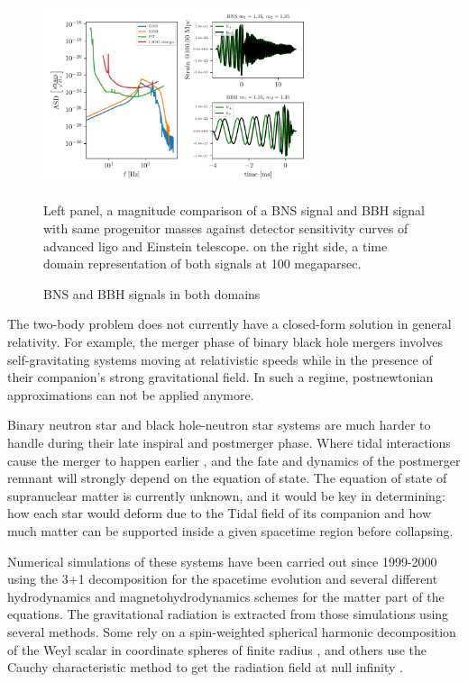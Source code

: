 \begin{figure}[hbt!]
\begin{center}

\includegraphics[width=0.7\textwidth, angle=0]{images/Data_analysis/sig_proc/BNS-BBH.pdf}
\caption{BNS and BBH signals in both domains}
\label{BBH and BNS}
\end{center}

Left panel, a magnitude comparison of a BNS signal\cite{Dietrich:2018phi} and BBH signal\cite{Estelles:2020osj} with same progenitor masses against detector sensitivity curves of advanced ligo and Einstein telescope. on the right side, a time domain representation of both signals at 100 megaparsec.

\end{figure}

\FloatBarrier


The two-body problem does not currently have a closed-form solution in general relativity. For example, the merger phase of binary black hole mergers involves self-gravitating systems moving at relativistic speeds while in the presence of their companion's strong gravitational field. In such a regime, postnewtonian approximations can not be applied anymore. 

Binary neutron star and black hole-neutron star systems are much harder to handle during their late inspiral and postmerger phase. Where tidal interactions cause the merger to happen earlier \cite{Hinderer:2009ca, Damour:2009wj,Damour:2012yf}, and the fate and dynamics of the postmerger remnant \cite{Shibata:2019wef} will strongly depend on the equation of state. The equation of state of supranuclear matter is currently unknown, and it would be key in determining:  how each star would deform due to the Tidal field of its companion and how much matter can be supported inside a given spacetime region before collapsing. 

Numerical simulations of these systems have been carried out since 1999-2000 \cite{Shibata:1999hn, Shibata:1999wm}  using the 3+1 decomposition for the spacetime evolution and several different hydrodynamics and magnetohydrodynamics schemes for the matter part of the equations. The gravitational radiation is extracted from those simulations using several methods. Some rely on a spin-weighted spherical harmonic decomposition of the Weyl scalar in coordinate spheres of finite radius \cite{Bishop:2016lgv}, and others use the Cauchy characteristic method to get the radiation field at null infinity \cite{Barkett:2019uae}. 

